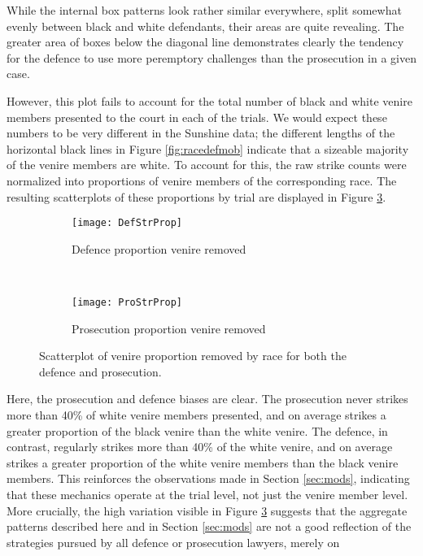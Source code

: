 While the internal box patterns look rather similar everywhere, split somewhat evenly between black and white defendants,
their areas are quite revealing. The greater area of boxes below the diagonal line demonstrates clearly the tendency for the defence to use more peremptory challenges than the prosecution in a given case.

However, this plot fails to account for
the total number of black and white venire members presented to the
court in each of the trials. We would expect these numbers to be very
different in the Sunshine data; the different lengths of the
horizontal black lines in Figure \ref{fig:racedefmob} indicate that a
sizeable majority of the venire members are white. To account for
this, the raw strike counts were normalized into proportions of venire
members of the corresponding race. The resulting scatterplots
of these proportions by trial are displayed in Figure \ref{fig:defproprop}.

\begin{figure}[h!]
  \centering
  \begin{subfigure}{0.45\textwidth}
    \texttt{[image: DefStrProp]}
    \caption{\footnotesize Defence proportion venire removed}
    \label{fig:defraceprop}
  \end{subfigure}
  ~
  \begin{subfigure}{0.45\textwidth}
    \texttt{[image: ProStrProp]}
    \caption{\footnotesize Prosecution proportion venire removed}
    \label{fig:proraceprop}
  \end{subfigure}
  \caption[Racial Strike Proportions by Party]
  {\footnotesize Scatterplot of venire proportion removed by race for both the defence and prosecution.}
  \label{fig:defproprop}
\end{figure}

Here, the prosecution and defence biases are clear. The prosecution never strikes more than 40\% of white venire members
presented, and on average strikes a greater proportion of the black venire than the white venire. The defence, in contrast,
regularly strikes more than 40\% of the white venire, and on average strikes a greater proportion of the white venire members than
the black venire members. This reinforces the observations made in Section \ref{sec:mods}, indicating that these mechanics
operate at the trial level, not just the venire member level. More crucially, the high variation visible in Figure
\ref{fig:defproprop} suggests that the aggregate patterns described
here and in Section \ref{sec:mods} are not a good reflection of the
strategies pursued by all defence or
prosecution lawyers, merely on

